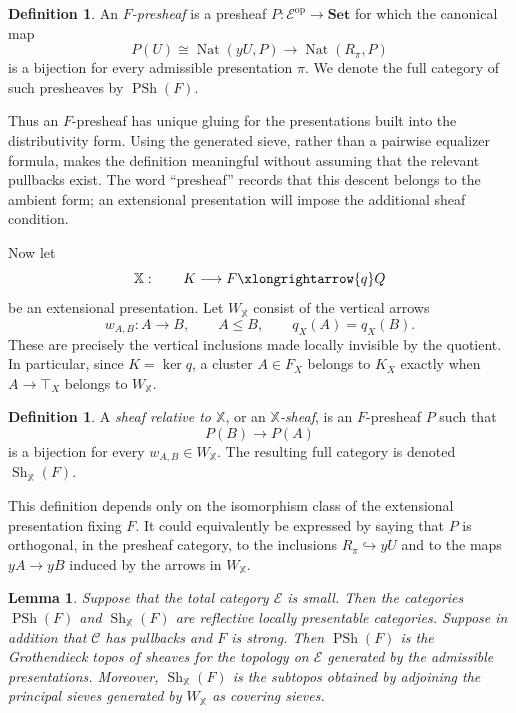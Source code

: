 \documentclass[12pt,oneside,reqno]{amsart}
\newtheorem{lemma}[theorem]{Lemma}
\theoremstyle{definition}
\newtheorem{definition}[theorem]{Definition}
\theoremstyle{remark}
\newcommand{\C}{\mathcal C}
\begin{document}
\begin{definition}\label{def:relative-presheaf}
An \emph{\(F\)-presheaf} is a presheaf
\(P:\mathcal E^{\mathrm{op}}\to\mathbf{Set}\) for which the canonical
map
\[
 P(U)\cong\operatorname{Nat}(yU,P)
       \longrightarrow\operatorname{Nat}(R_\pi,P)
\]
is a bijection for every admissible presentation \(\pi\).  We denote the
full category of such presheaves by \(\operatorname{PSh}(F)\).
\end{definition}

Thus an \(F\)-presheaf has unique gluing for the presentations built into
the distributivity form.  Using the generated sieve, rather than a
pairwise equalizer formula, makes the definition meaningful without
assuming that the relevant pullbacks exist.  The word ``presheaf'' records
that this descent belongs to the ambient form; an extensional presentation
will impose the additional sheaf condition.

Now let
\[
 \mathbb X:\qquad K\longrightarrow F\xlongrightarrow{q}Q
\]
be an extensional presentation.  Let \(W_{\mathbb X}\) consist of the
vertical arrows
\[
                  w_{A,B}:A\longrightarrow B,
 \qquad A\leqslant B,\qquad q_X(A)=q_X(B).
\]
These are precisely the vertical inclusions made locally invisible by the
quotient.  In particular, since \(K=\ker q\), a cluster \(A\in F_X\)
belongs to \(K_X\) exactly when
\(A\to\top_X\) belongs to \(W_{\mathbb X}\).

\begin{definition}\label{def:relative-sheaf}
A \emph{sheaf relative to \(\mathbb X\)}, or an
\emph{\(\mathbb X\)-sheaf}, is an \(F\)-presheaf \(P\) such that
\[
                         P(B)\longrightarrow P(A)
\]
is a bijection for every \(w_{A,B}\in W_{\mathbb X}\).  The resulting
full category is denoted \(\operatorname{Sh}_{\mathbb X}(F)\).
\end{definition}

This definition depends only on the isomorphism class of the extensional
presentation fixing \(F\).  It could equivalently be expressed by saying
that \(P\) is orthogonal, in the presheaf category, to the inclusions
\(R_\pi\hookrightarrow yU\) and to the maps
\(yA\to yB\) induced by the arrows in \(W_{\mathbb X}\).

\begin{lemma}\label{lem:relative-sheaf-categories}
Suppose that the total category \(\mathcal E\) is small.  Then the
categories \(\operatorname{PSh}(F)\) and
\(\operatorname{Sh}_{\mathbb X}(F)\) are reflective locally presentable
categories.  Suppose in addition that \(\C\) has pullbacks and \(F\) is
strong.  Then \(\operatorname{PSh}(F)\) is the Grothendieck topos of
sheaves for the topology on \(\mathcal E\) generated by the admissible
presentations.  Moreover, \(\operatorname{Sh}_{\mathbb X}(F)\) is the
subtopos obtained by adjoining the principal sieves generated by
\(W_{\mathbb X}\) as covering sieves.
\end{lemma}
\end{document}
